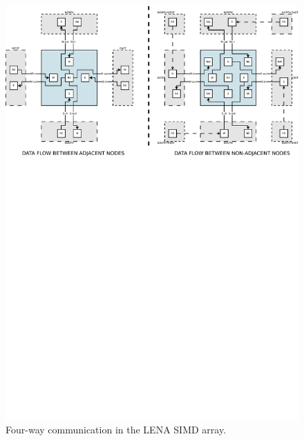 \begin{figure}[h]
  \centering
  \includegraphics[width=\linewidth,clip,trim=0 18cm 0 0]
                  {fig/fpga/fpga-simd-datacom.pdf}
  \caption{Four-way communication in the LENA SIMD array.}
  \label{fig:fpga-simd-datacom}
\end{figure}
